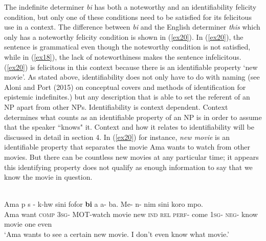\documentclass[output=paper,
modfonts
]{langsci/langscibook}
\begin{document}
The indefinite determiner \emph{bi} has both a noteworthy and an identifiability felicity condition, but only one of these conditions need to be satisfied for its felicitous use in a context. The difference between \emph{bi} and the English determiner \emph{this} which only has a noteworthy felicity condition is shown in (\ref{ex20}). In  (\ref{ex20}), the sentence is grammatical even though the noteworthy condition is not satisfied, while in (\ref{ex18}), the lack of noteworthiness makes the sentence infelicitous. (\ref{ex20}) is felicitous in this context because there is an identifiable property `new movie'. As stated above, identifiability does not only have to do with naming (see Aloni and Port (2015) on conceptual covers and methods of identification for epistemic indefinites.) but any description that is able to set the referent of an NP apart from other NPs. Identifiability is context dependent. Context determines what counts as an identifiable property of an NP is in order to assume that the speaker ``knows" it. Context and how it relates to identifiability will be discussed in detail in section 4. In (\ref{ex20}) for instance, \emph{new movie} is an identifiable property that separates the movie Ama wants to watch from other movies.  But there can be countless new movies at any particular time; it appears this identifying property does not qualify as enough information to say that we know the movie in question. 

\ea
{}\\
\ea\label{ex20}
\gll Ama p s - k-hw sini fofor \textbf{bi} a a- ba. Me- n- nim sini koro mpo.\\
Ama want \textsc{comp} \textsc{3sg}- \textsc{MOT}-watch movie new \textsc{ind} \textsc{rel} \textsc{perf}- come \textsc{1sg}- \textsc{neg}- know movie one even \\
\glt `Ama wants to see a certain new movie. I don't even know what movie.'
\end{document}
